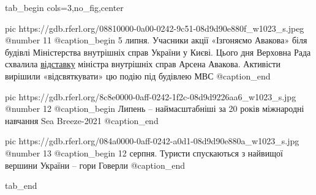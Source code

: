  
 
 
 
 


\ifcmt
  tab_begin cols=3,no_fig,center

     pic https://gdb.rferl.org/08810000-0a00-0242-9c51-08d9d90e880f_w1023_s.jpeg
		 @number 11
		 @caption_begin
5 липня. Учасники акції «Ізгоняємо Авакова» біля будівлі Міністерства
внутрішніх справ України у Києві. Цього дня Верховна Рада схвалила
\href{https://www.radiosvoboda.org/a/avakov-vidstavka-ministr-mvs/31356874.html}{відставку}
міністра внутрішніх справ Арсена Авакова. Активісти вирішили «відсвяткувати» цю
подію під будівлею МВС 
		 @caption_end

		 pic https://gdb.rferl.org/8c8e0000-0aff-0242-1f2c-08d9d9226aa6_w1023_s.jpg
		 @number 12
		 @caption_begin
Липень – наймасштабніші за 20 років міжнародні навчання Sea Breeze-2021 
		 @caption_end

		 pic https://gdb.rferl.org/084a0000-0aff-0242-a0d1-08d9d90e880a_w1023_s.jpg
		 @number 13
		 @caption_begin
12 серпня. Туристи спускаються з найвищої вершини України – гори Говерли
		 @caption_end

  tab_end
\fi
